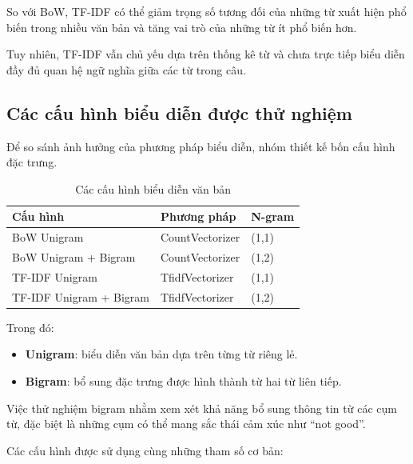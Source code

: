 So với BoW, TF-IDF có thể giảm trọng số tương đối của những từ xuất hiện phổ biến trong nhiều văn bản và tăng vai trò của những từ ít phổ biến hơn.

Tuy nhiên, TF-IDF vẫn chủ yếu dựa trên thống kê từ và chưa trực tiếp biểu diễn đầy đủ quan hệ ngữ nghĩa giữa các từ trong câu.


\subsection{Các cấu hình biểu diễn được thử nghiệm}

Để so sánh ảnh hưởng của phương pháp biểu diễn, nhóm thiết kế bốn cấu hình đặc trưng.

\begin{table}[H]
\centering
\caption{Các cấu hình biểu diễn văn bản}
\label{tab:cau-hinh-vector}
\renewcommand{\arraystretch}{1.15}
\small

\begin{tabularx}{\textwidth}{|X|l|l|}
\hline
\textbf{Cấu hình}
& \textbf{Phương pháp}
& \textbf{N-gram} \\
\hline

BoW Unigram
& CountVectorizer
& (1,1) \\
\hline

BoW Unigram + Bigram
& CountVectorizer
& (1,2) \\
\hline

TF-IDF Unigram
& TfidfVectorizer
& (1,1) \\
\hline

TF-IDF Unigram + Bigram
& TfidfVectorizer
& (1,2) \\
\hline

\end{tabularx}
\end{table}

Trong đó:

\begin{itemize}
    \item \textbf{Unigram}: biểu diễn văn bản dựa trên từng từ riêng lẻ.

    \item \textbf{Bigram}: bổ sung đặc trưng được hình thành từ hai từ liên tiếp.
\end{itemize}

Việc thử nghiệm bigram nhằm xem xét khả năng bổ sung thông tin từ các cụm từ, đặc biệt là những cụm có thể mang sắc thái cảm xúc như ``not good''.

Các cấu hình được sử dụng cùng những tham số cơ bản:

